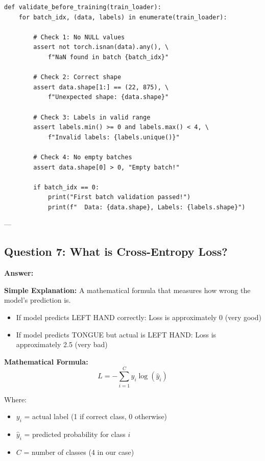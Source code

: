 \documentclass[12pt,a4paper]{article}
\begin{document}
\begin{lstlisting}
def validate_before_training(train_loader):
    for batch_idx, (data, labels) in enumerate(train_loader):
        
        # Check 1: No NULL values
        assert not torch.isnan(data).any(), \
            f"NaN found in batch {batch_idx}"
        
        # Check 2: Correct shape
        assert data.shape[1:] == (22, 875), \
            f"Unexpected shape: {data.shape}"
        
        # Check 3: Labels in valid range
        assert labels.min() >= 0 and labels.max() < 4, \
            f"Invalid labels: {labels.unique()}"
        
        # Check 4: No empty batches
        assert data.shape[0] > 0, "Empty batch!"
        
        if batch_idx == 0:
            print("First batch validation passed!")
            print(f"  Data: {data.shape}, Labels: {labels.shape}")
\end{lstlisting}

---

\subsection{Question 7: What is Cross-Entropy Loss?}

\textbf{Answer:}

\textbf{Simple Explanation:} A mathematical formula that measures how wrong the model's prediction is.

\begin{itemize}
    \item If model predicts LEFT HAND correctly: Loss is approximately 0 (very good)
    \item If model predicts TONGUE but actual is LEFT HAND: Loss is approximately 2.5 (very bad)
\end{itemize}

\textbf{Mathematical Formula:}
\begin{equation}
L = -\sum_{i=1}^{C} y_i \log(\hat{y}_i)
\end{equation}

Where:
\begin{itemize}
    \item $y_i$ = actual label (1 if correct class, 0 otherwise)
    \item $\hat{y}_i$ = predicted probability for class $i$
    \item $C$ = number of classes (4 in our case)
\end{itemize}
\end{document}
